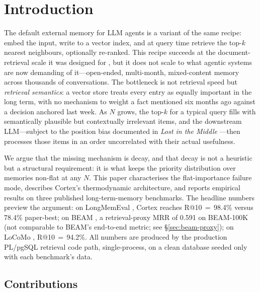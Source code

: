 \documentclass[11pt]{article}
\begin{document}
\section{Introduction}
\label{sec:intro}

The default external memory for LLM agents is a variant of the same
recipe: embed the input, write to a vector index, and at query time
retrieve the top-$k$ nearest neighbours, optionally re-ranked.  This
recipe succeeds at the document-retrieval scale it was designed for
\citep{Lewis2020}, but it does not scale to what agentic systems
are now demanding of it---open-ended, multi-month, mixed-content
memory across thousands of conversations.  The bottleneck is not
retrieval speed but \emph{retrieval semantics}: a vector store
treats every entry as equally important in the long term, with no
mechanism to weight a fact mentioned six months ago against a
decision anchored last week.  As $N$ grows, the top-$k$ for a
typical query fills with semantically plausible but contextually
irrelevant items, and the downstream LLM---subject to the position
bias documented in \emph{Lost in the Middle} \citep{Liu2023}---then
processes those items in an order uncorrelated with their actual
usefulness.

We argue that the missing mechanism is decay, and that decay is not
a heuristic but a structural requirement: it is what keeps the
priority distribution over memories non-flat at any $N$.  This paper
characterises the flat-importance failure mode, describes Cortex's
thermodynamic architecture, and reports empirical results on three
published long-term-memory benchmarks.  The headline numbers preview
the argument: on LongMemEval \citep{Wu2025}, Cortex reaches
R@10\,$=$\,98.4\% versus 78.4\% paper-best; on BEAM
\citep{Tavakoli2026}, a retrieval-proxy MRR of 0.591 on BEAM-100K
(not comparable to BEAM's end-to-end metric; see
\S\ref{sec:beam-proxy}); on
LoCoMo \citep{Maharana2024}, R@10\,$=$\,94.2\%.  All numbers are
produced by the production PL/pgSQL retrieval code path,
single-process, on a clean database seeded only with each
benchmark's data.

\subsection{Contributions}
\label{sec:contributions}
\end{document}
